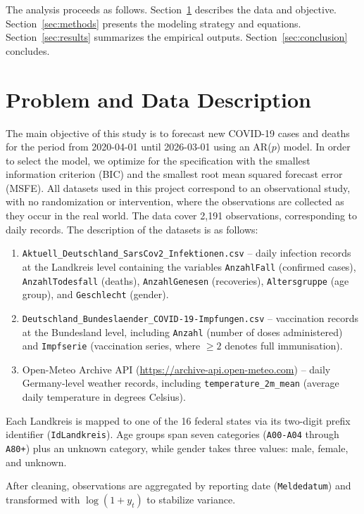 ﻿\documentclass[12pt,a4paper]{article}
\begin{document}
The analysis proceeds as follows. Section~\ref{sec:data} describes the data and objective. Section~\ref{sec:methods} presents the modeling strategy and equations. Section~\ref{sec:results} summarizes the empirical outputs. Section~\ref{sec:conclusion} concludes.

\section{Problem and Data Description}
\label{sec:data}

The main objective of this study is to forecast new COVID-19 cases and deaths for the period from 2020-04-01 until 2026-03-01 using an AR($p$) model. In order to select the model, we optimize for the specification with the smallest information criterion (BIC) and the smallest root mean squared forecast error (MSFE). All datasets used in this project correspond to an observational study, with no randomization or intervention, where the observations are collected as they occur in the real world. The data cover 2,191 observations, corresponding to daily records. The description of the datasets is as follows:

\begin{enumerate}
    \item \texttt{Aktuell\_Deutschland\_SarsCov2\_Infektionen.csv} -- daily infection records at the Landkreis level containing the variables \texttt{AnzahlFall} (confirmed cases), \texttt{AnzahlTodesfall} (deaths), \texttt{AnzahlGenesen} (recoveries), \texttt{Altersgruppe} (age group), and \texttt{Geschlecht} (gender).
    \item \texttt{Deutschland\_Bundeslaender\_COVID-19-Impfungen.csv} -- vaccination records at the Bundesland level, including \texttt{Anzahl} (number of doses administered) and \texttt{Impfserie} (vaccination series, where $\geq 2$ denotes full immunisation).
    \item Open-Meteo Archive API (\url{https://archive-api.open-meteo.com}) -- daily Germany-level weather records, including \texttt{temperature\_2m\_mean} (average daily temperature in degrees Celsius).
\end{enumerate}

Each Landkreis is mapped to one of the 16 federal states via its two-digit prefix identifier (\texttt{IdLandkreis}). Age groups span seven categories (\texttt{A00-A04} through \texttt{A80+}) plus an unknown category, while gender takes three values: male, female, and unknown.

After cleaning, observations are aggregated by reporting date (\texttt{Meldedatum}) and transformed with \(\log(1+y_t)\) to stabilize variance.
\end{document}
